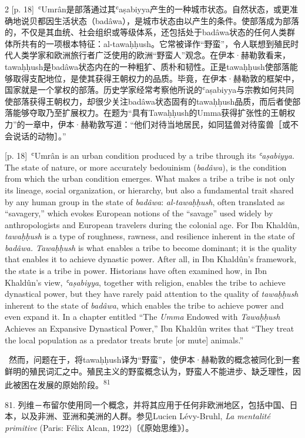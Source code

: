 \documentclass[10pt,a4paper]{article}
\begin{document}
\begin{paracol}{2}
{\scriptsize\color{gray} [p. 18]}\ ʿUmrân是部落通过其ʿaṣabiyya产生的一种城市状态。自然状态，或更准确地说贝都因生活状态（badâwa），是城市状态由以产生的条件。使部落成为部落的，不仅是其血统、社会组织或等级体系，还包括处于badâwa状态的任何人类群体所共有的一项根本特征：al-tawaḥḥush。它常被译作“野蛮”，令人联想到殖民时代人类学家和欧洲旅行者广泛使用的欧洲“野蛮人”观念。在伊本·赫勒敦看来，tawaḥḥush是badâwa状态内在的一种粗犷、质朴和韧性。正是tawaḥḥush使部落能够取得支配地位，是使其获得王朝权力的品质。毕竟，在伊本·赫勒敦的框架中，国家就是一个掌权的部落。历史学家经常考察他所说的ʿaṣabiyya与宗教如何共同使部落获得王朝权力，却很少关注badâwa状态固有的tawaḥḥush品质，而后者使部落能够夺取乃至扩展权力。在题为“具有Tawaḥḥush的Umma获得扩张性的王朝权力”的一章中，伊本·赫勒敦写道：“他们对待当地居民，如同猛兽对待蛮兽［或不会说话的动物］。”\par
\switchcolumn
{\scriptsize\color{gray} [p. 18]}\ ʿUmrân is an urban condition produced by a tribe through its \textit{ʿaṣabiyya.} The state of nature, or more accurately bedouinism (\textit{badâwa}), is the condition from which the urban condition emerges. What makes a tribe a tribe is not only its lineage, social organization, or hierarchy, but also a fundamental trait shared by any human group in the state of \textit{badâwa}: \textit{al-tawaḥḥush}, often translated as “savagery,” which evokes European notions of the “savage” used widely by anthropologists and European travelers during the colonial age. For Ibn Khaldûn, \textit{tawaḥḥush} is a type of roughness, rawness, and resilience inherent in the state of \textit{badâwa. Tawaḥḥush} is what enables a tribe to become dominant; it is the quality that enables it to achieve dynastic power. After all, in Ibn Khaldûn’s framework, the state is a tribe in power. Historians have often examined how, in Ibn Khaldûn’s view, \textit{ʿaṣabiyya}, together with religion, enables the tribe to achieve dynastical power, but they have rarely paid attention to the quality of \textit{tawaḥḥush} inherent to the state of \textit{badâwa}, which enables the tribe to achieve power and even expand it. In a chapter entitled “The \textit{Umma} Endowed with \textit{Tawaḥḥush} Achieves an Expansive Dynastical Power,” Ibn Khaldûn writes that “They treat the local population as a predator treats brute [or mute] animals.”\par
\switchcolumn*
{\scriptsize\color{gray} [p. 19]}\ 然而，问题在于，将tawaḥḥush译为“野蛮”，使伊本·赫勒敦的概念被同化到一套鲜明的殖民词汇之中。殖民主义的野蛮概念认为，野蛮人不能进步、缺乏理性，因此被困在发展的原始阶\mbox{段。\textsuperscript{81}}\par{\small 81. 列维－布留尔使用同一个概念，并将其应用于任何非欧洲地区，包括中国、日本，以及非洲、亚洲和美洲的人群。参见Lucien Lévy-Bruhl, \textit{La mentalité primitive} (Paris: Félix Alcan, 1922)〔《原始思维》〕。\par}

\end{paracol}
\end{document}
